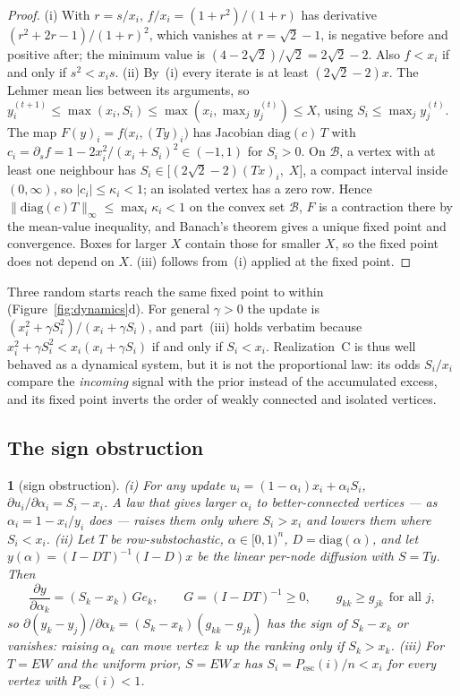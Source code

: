\documentclass[11pt,a4paper]{article}
\theoremstyle{definition}
\theoremstyle{plain}
\newcommand{\genpropname}{}
\newtheorem*{genprop}{\genpropname}
\newenvironment{prop}[1]{\renewcommand{\genpropname}{Proposition #1}\begin{genprop}}{\end{genprop}}
\newcommand{\Pesc}{P_{\mathrm{esc}}}
\newcommand{\diag}{\mathrm{diag}}
\begin{document}
\begin{proof}
(i) With $r=s/x_i$, $f/x_i=(1+r^2)/(1+r)$ has derivative $(r^2+2r-1)/(1+r)^2$, which vanishes at $r=\sqrt2-1$, is negative before and positive after; the minimum value is $(4-2\sqrt2)/\sqrt2=2\sqrt2-2$. Also $f<x_i$ if and only if $s^2<x_is$. (ii) By~(i) every iterate is at least $(2\sqrt2-2)x$. The Lehmer mean lies between its arguments, so $y^{(t+1)}_i\le\max(x_i,S_i)\le\max(x_i,\max_jy^{(t)}_j)\le X$, using $S_i\le\max_jy^{(t)}_j$. The map $F(y)_i=f\big(x_i,(Ty)_i\big)$ has Jacobian $\diag(c)\,T$ with $c_i=\partial_sf=1-2x_i^2/(x_i+S_i)^2\in(-1,1)$ for $S_i>0$. On $\mathcal B$, a vertex with at least one neighbour has $S_i\in\big[(2\sqrt2-2)(Tx)_i,\;X\big]$, a compact interval inside $(0,\infty)$, so $|c_i|\le\kappa_i<1$; an isolated vertex has a zero row. Hence $\|\diag(c)T\|_\infty\le\max_i\kappa_i<1$ on the convex set $\mathcal B$, $F$ is a contraction there by the mean-value inequality, and Banach's theorem gives a unique fixed point and convergence. Boxes for larger $X$ contain those for smaller $X$, so the fixed point does not depend on $X$. (iii) follows from~(i) applied at the fixed point.
\end{proof}

Three random starts reach the same fixed point to within \CStartsDiff{} (Figure~\ref{fig:dynamics}d). For general $\gamma>0$ the update is $(x_i^2+\gamma S_i^2)/(x_i+\gamma S_i)$, and part~(iii) holds verbatim because $x_i^2+\gamma S_i^2<x_i(x_i+\gamma S_i)$ if and only if $S_i<x_i$. Realization~C is thus well behaved as a dynamical system, but it is not the proportional law: its odds $S_i/x_i$ compare the \emph{incoming} signal with the prior instead of the accumulated excess, and its fixed point inverts the order of weakly connected and isolated vertices.

\subsection{The sign obstruction}

\begin{prop}{E}[sign obstruction]
(i) For any update $u_i=(1-\alpha_i)x_i+\alpha_iS_i$, $\partial u_i/\partial\alpha_i=S_i-x_i$. A law that gives larger $\alpha_i$ to better-connected vertices --- as $\alpha_i=1-x_i/y_i$ does --- raises them only where $S_i>x_i$ and lowers them where $S_i<x_i$.
(ii) Let $T$ be row-substochastic, $\alpha\in[0,1)^n$, $D=\diag(\alpha)$, and let $y(\alpha)=(I-DT)^{-1}(I-D)x$ be the linear per-node diffusion with $S=Ty$. Then
\begin{equation}\label{eq:sign}
\frac{\partial y}{\partial\alpha_k}=(S_k-x_k)\,G e_k,\qquad G=(I-DT)^{-1}\ge0,\qquad g_{kk}\ge g_{jk}\ \ \text{for all }j,
\end{equation}
so $\partial(y_k-y_j)/\partial\alpha_k=(S_k-x_k)(g_{kk}-g_{jk})$ has the sign of $S_k-x_k$ or vanishes: raising $\alpha_k$ can move vertex~$k$ up the ranking only if $S_k>x_k$.
(iii) For $T=EW$ and the uniform prior, $S=EW\,x$ has $S_i=\Pesc(i)/n<x_i$ for every vertex with $\Pesc(i)<1$.
\end{prop}
\end{document}
